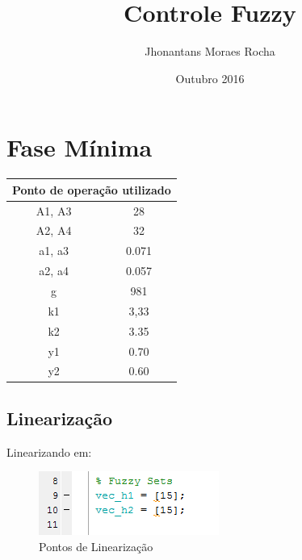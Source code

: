\documentclass[11pt,]{article}
\title{Controle Fuzzy}
\author{Jhonantans Moraes Rocha }
\date{Outubro 2016}
\begin{document}
\maketitle

    \section{Fase Mínima}      
    \begin{center}
	     \begin{tabular}{|c|c|}
	            \hline
	            \multicolumn{2}{|c|}{Ponto de operação utilizado} \\
	            \hline\hline
	             A1, A3 & 28 \\ \hline
	             A2, A4 & 32 \\ \hline
	             a1, a3 & 0.071 \\ \hline
	             a2, a4 & 0.057 \\ \hline
	             g & 981 \\ \hline
	             k1 & 3,33 \\ \hline
	             k2 & 3.35 \\ \hline
	             y1 & 0.70 \\ \hline
	             y2 & 0.60 \\ \hline
	            \hline
	        \end{tabular}
	 \end{center}
	
	\subsection{Linearização}    
	    Linearizando em:
	    \begin{figure}[H]
	    	\centering
	    	\includegraphics[scale=1]{cod_fuz_15.png}
	    	\caption{Pontos de Linearização}
	    	\label{CodigoLin15}
	    \end{figure}
        
\end{document}
